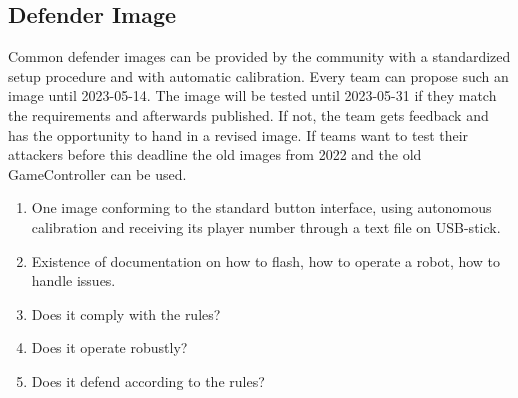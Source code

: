 \subsection{Defender Image}
\label{sec:Challenge_image}
Common defender images can be provided by the community with a standardized setup procedure and with automatic calibration. Every team can propose such an image until 2023-05-14. The image will be tested until 2023-05-31 if they match the requirements and afterwards published. If not, the team gets feedback and has the opportunity to hand in a revised image. If teams want to test their attackers before this deadline the old images from 2022 and the old GameController can be used.

\begin{enumerate}
	\item One image conforming to the standard button interface, using autonomous calibration and receiving its player number through a text file on USB-stick.
	\item Existence of documentation on how to flash, how to operate a robot, how to handle issues.
	\item Does it comply with the rules?
	\item Does it operate robustly?
	\item Does it defend according to the rules?
\end{enumerate}

